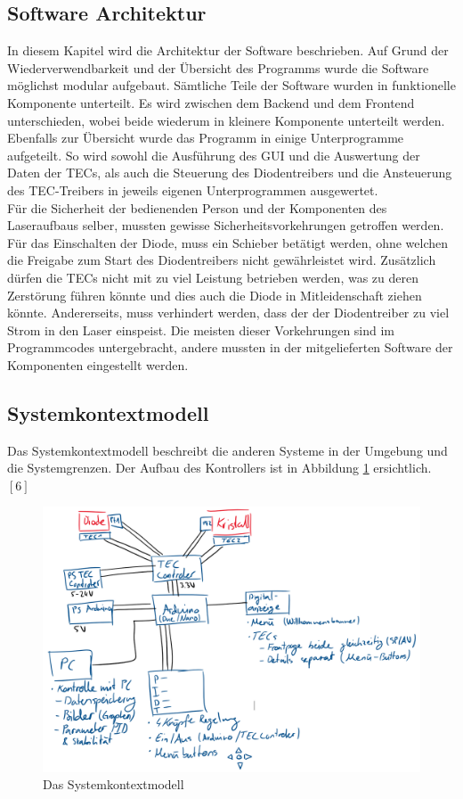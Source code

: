 \subsection{Software Architektur}
In diesem Kapitel wird die Architektur der Software beschrieben. Auf Grund der Wiederverwendbarkeit und der Übersicht des Programms wurde die Software möglichst modular aufgebaut. Sämtliche Teile der Software wurden in funktionelle Komponente unterteilt. Es wird zwischen dem Backend und dem Frontend unterschieden, wobei beide wiederum in kleinere Komponente unterteilt werden. Ebenfalls zur Übersicht wurde das Programm in einige Unterprogramme aufgeteilt. So wird sowohl die Ausführung des GUI und die Auswertung der Daten der TECs, als auch die Steuerung des Diodentreibers und die Ansteuerung des TEC-Treibers in jeweils eigenen Unterprogrammen ausgewertet.\\
Für die Sicherheit der bedienenden Person und der Komponenten des Laseraufbaus selber, mussten gewisse Sicherheitsvorkehrungen getroffen werden. Für das Einschalten der Diode, muss ein Schieber betätigt werden, ohne welchen die Freigabe zum Start des Diodentreibers nicht gewährleistet wird. Zusätzlich dürfen die TECs nicht mit zu viel Leistung betrieben werden, was zu deren Zerstörung führen könnte und dies auch die Diode in Mitleidenschaft ziehen könnte. Andererseits, muss verhindert werden, dass der der Diodentreiber zu viel Strom in den Laser einspeist. Die meisten dieser Vorkehrungen sind im Programmcodes untergebracht, andere mussten in der mitgelieferten Software der Komponenten eingestellt werden.

\subsection{Systemkontextmodell}
Das Systemkontextmodell beschreibt die anderen Systeme in der Umgebung und die Systemgrenzen. Der Aufbau des Kontrollers ist in Abbildung \ref{fig:systemkontextmodell} ersichtlich. $[6]$

\begin{figure}
    \centering
    \includegraphics{98_images/scheme_wiring.PNG}
    \caption{Das Systemkontextmodell}
    \label{fig:systemkontextmodell}
\end{figure}

